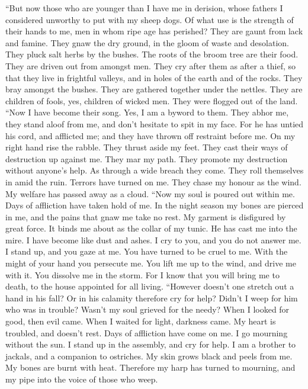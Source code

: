 ``But now those who are younger than I have me in
derision, whose fathers I considered unworthy to put with my sheep dogs.
 Of what use is the strength of their hands to me, men in
whom ripe age has perished?  They are gaunt from lack and
famine. They gnaw the dry ground, in the gloom of waste and desolation.
 They pluck salt herbs by the bushes. The roots of the
broom tree are their food.  They are driven out from
amongst men. They cry after them as after a thief,  so
that they live in frightful valleys, and in holes of the earth and of
the rocks.  They bray amongst the bushes. They are
gathered together under the nettles.  They are children of
fools, yes, children of wicked men. They were flogged out of the land.
 ``Now I have become their song. Yes, I am a byword to
them.  They abhor me, they stand aloof from me, and don't
hesitate to spit in my face.  For he has untied his cord,
and afflicted me; and they have thrown off restraint before me.
 On my right hand rise the rabble. They thrust aside my
feet. They cast their ways of destruction up against me. 
They mar my path. They promote my destruction without anyone's help.
 As through a wide breach they come. They roll themselves
in amid the ruin.  Terrors have turned on me. They chase
my honour as the wind. My welfare has passed away as a cloud.
 ``Now my soul is poured out within me. Days of
affliction have taken hold of me.  In the night season my
bones are pierced in me, and the pains that gnaw me take no rest.
 My garment is disfigured by great force. It binds me
about as the collar of my tunic.  He has cast me into the
mire. I have become like dust and ashes.  I cry to you,
and you do not answer me. I stand up, and you gaze at me.
 You have turned to be cruel to me. With the might of
your hand you persecute me.  You lift me up to the wind,
and drive me with it. You dissolve me in the storm.  For
I know that you will bring me to death, to the house appointed for all
living.  ``However doesn't one stretch out a hand in his
fall? Or in his calamity therefore cry for help?  Didn't
I weep for him who was in trouble? Wasn't my soul grieved for the needy?
 When I looked for good, then evil came. When I waited
for light, darkness came.  My heart is troubled, and
doesn't rest. Days of affliction have come on me.  I go
mourning without the sun. I stand up in the assembly, and cry for help.
 I am a brother to jackals, and a companion to ostriches.
 My skin grows black and peels from me. My bones are
burnt with heat.  Therefore my harp has turned to
mourning, and my pipe into the voice of those who weep.

